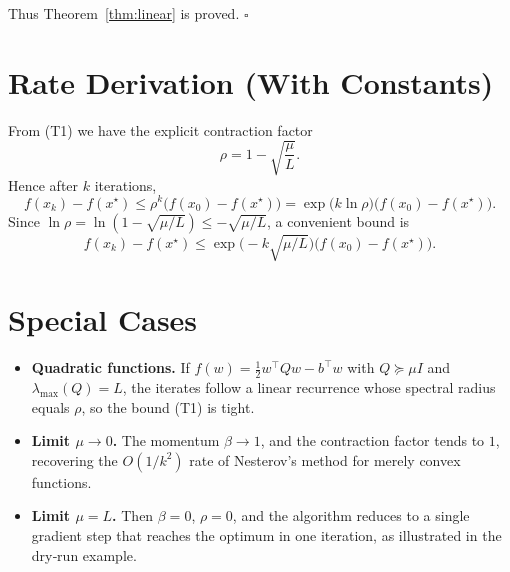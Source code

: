 \documentclass{article}
\begin{document}
Thus Theorem~\ref{thm:linear} is proved. \hfill $\square$

\section*{Rate Derivation (With Constants)}
From (T1) we have the explicit contraction factor
\[
\rho = 1-\sqrt{\frac{\mu}{L}}.
\]
Hence after $k$ iterations,
\[
f(x_{k})-f(x^{\star})\le \rho^{k}\bigl(f(x_{0})-f(x^{\star})\bigr)
= \exp\!\bigl(k\ln\rho\bigr)\bigl(f(x_{0})-f(x^{\star})\bigr).
\]
Since $\ln\rho = \ln(1-\sqrt{\mu/L})\le -\sqrt{\mu/L}$, a convenient bound is
\[
f(x_{k})-f(x^{\star})\le
\exp\!\bigl(-k\sqrt{\mu/L}\bigr)\bigl(f(x_{0})-f(x^{\star})\bigr).
\]

\section*{Special Cases}
\begin{itemize}
\item \textbf{Quadratic functions.} If $f(w)=\tfrac12 w^{\top}Q w - b^{\top}w$ with $Q\succeq\mu I$ and $\lambda_{\max}(Q)=L$, the iterates follow a linear recurrence whose spectral radius equals $\rho$, so the bound (T1) is tight.
\item \textbf{Limit $\mu\to0$.} The momentum $\beta\to 1$, and the contraction factor tends to $1$, recovering the $O(1/k^{2})$ rate of Nesterov’s method for merely convex functions.
\item \textbf{Limit $\mu=L$.} Then $\beta=0$, $\rho=0$, and the algorithm reduces to a single gradient step that reaches the optimum in one iteration, as illustrated in the dry‑run example.
\end{itemize}
\end{document}
